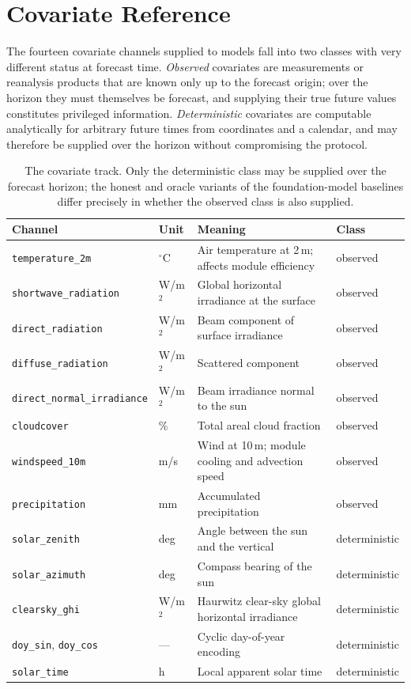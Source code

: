 \chapter{Covariate Reference}
\label{app:covariates}

The fourteen covariate channels supplied to models fall into two classes with very different
status at forecast time. \emph{Observed} covariates are measurements or reanalysis products
that are known only up to the forecast origin; over the horizon they must themselves be
forecast, and supplying their true future values constitutes privileged information.
\emph{Deterministic} covariates are computable analytically for arbitrary future times from
coordinates and a calendar, and may therefore be supplied over the horizon without
compromising the protocol.

\begin{table}[h!]
\centering
\small
\begin{tabular}{l l p{6.4cm} l}
\hline
\textbf{Channel} & \textbf{Unit} & \textbf{Meaning} & \textbf{Class} \\
\hline
\texttt{temperature\_2m} & $^\circ$C & Air temperature at 2\,m; affects module efficiency &
observed \\
\texttt{shortwave\_radiation} & W/m$^2$ & Global horizontal irradiance at the surface &
observed \\
\texttt{direct\_radiation} & W/m$^2$ & Beam component of surface irradiance & observed \\
\texttt{diffuse\_radiation} & W/m$^2$ & Scattered component & observed \\
\texttt{direct\_normal\_irradiance} & W/m$^2$ & Beam irradiance normal to the sun &
observed \\
\texttt{cloudcover} & \% & Total areal cloud fraction & observed \\
\texttt{windspeed\_10m} & m/s & Wind at 10\,m; module cooling and advection speed &
observed \\
\texttt{precipitation} & mm & Accumulated precipitation & observed \\
\texttt{solar\_zenith} & deg & Angle between the sun and the vertical & deterministic \\
\texttt{solar\_azimuth} & deg & Compass bearing of the sun & deterministic \\
\texttt{clearsky\_ghi} & W/m$^2$ & Haurwitz clear-sky global horizontal
irradiance~\cite{haurwitz} & deterministic \\
\texttt{doy\_sin}, \texttt{doy\_cos} & --- & Cyclic day-of-year encoding & deterministic \\
\texttt{solar\_time} & h & Local apparent solar time & deterministic \\
\hline
\end{tabular}
\caption{The covariate track. Only the deterministic class may be supplied over the forecast
horizon; the honest and oracle variants of the foundation-model baselines differ precisely in
whether the observed class is also supplied.}
\label{tab:covariates}
\end{table}

